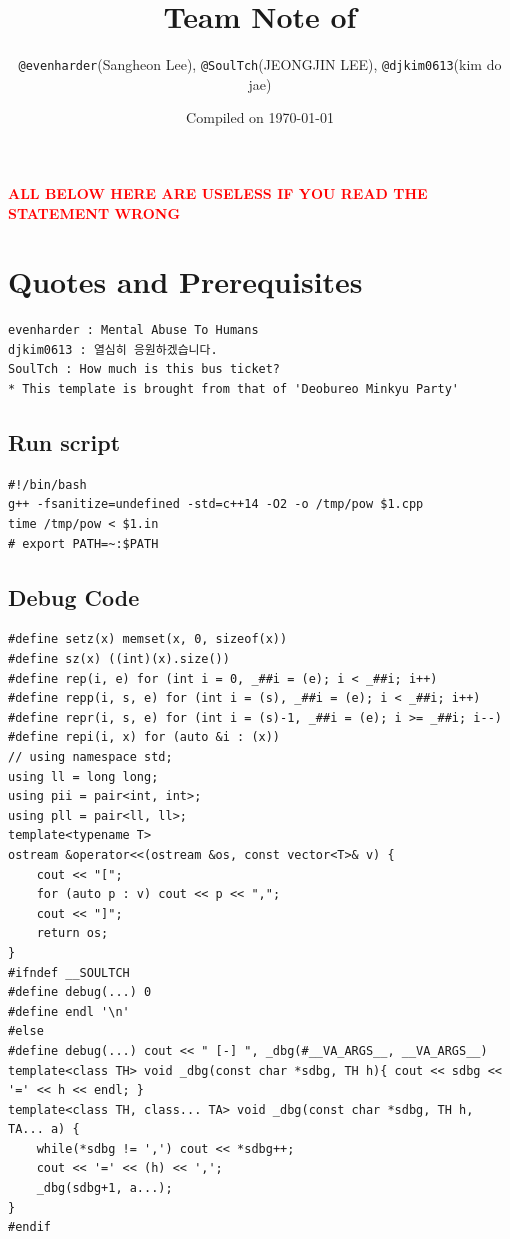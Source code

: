 \documentclass[landscape, 8pt, a4paper, oneside, twocolumn]{extarticle}
\title{Team Note of \texttt{\teamname}}
\author{\texttt{@evenharder}(Sangheon Lee), \texttt{@SoulTch}(JEONGJIN LEE), \texttt{@djkim0613}(kim do jae)}
\date{Compiled on \today}
\begin{document}
{
	\Large
	
	\maketitle
	\setcounter{tocdepth}{2}
    \tableofcontents
}
\thispagestyle{fancy}

\pagebreak

 \textcolor{red}{\textbf{ALL BELOW HERE ARE USELESS IF YOU READ THE STATEMENT WRONG}}
 

\setcounter{section}{-1}
\section{Quotes and Prerequisites}
\begin{verbatim}
evenharder : Mental Abuse To Humans
djkim0613 : 열심히 응원하겠습니다.
SoulTch : How much is this bus ticket?  
* This template is brought from that of 'Deobureo Minkyu Party'
\end{verbatim}
\subsection*{Run script}
\begin{verbatim}
#!/bin/bash
g++ -fsanitize=undefined -std=c++14 -O2 -o /tmp/pow $1.cpp
time /tmp/pow < $1.in
# export PATH=~:$PATH
\end{verbatim}

\subsection*{Debug Code}
\begin{verbatim}
#define setz(x) memset(x, 0, sizeof(x))
#define sz(x) ((int)(x).size())
#define rep(i, e) for (int i = 0, _##i = (e); i < _##i; i++)
#define repp(i, s, e) for (int i = (s), _##i = (e); i < _##i; i++)
#define repr(i, s, e) for (int i = (s)-1, _##i = (e); i >= _##i; i--)
#define repi(i, x) for (auto &i : (x))
// using namespace std;
using ll = long long;
using pii = pair<int, int>;
using pll = pair<ll, ll>;
template<typename T>
ostream &operator<<(ostream &os, const vector<T>& v) {
    cout << "[";
    for (auto p : v) cout << p << ",";
    cout << "]";
    return os;
}
#ifndef __SOULTCH
#define debug(...) 0
#define endl '\n'
#else
#define debug(...) cout << " [-] ", _dbg(#__VA_ARGS__, __VA_ARGS__)
template<class TH> void _dbg(const char *sdbg, TH h){ cout << sdbg << '=' << h << endl; }
template<class TH, class... TA> void _dbg(const char *sdbg, TH h, TA... a) {
    while(*sdbg != ',') cout << *sdbg++;
    cout << '=' << (h) << ','; 
    _dbg(sdbg+1, a...);
}
#endif
\end{verbatim}
\end{document}
